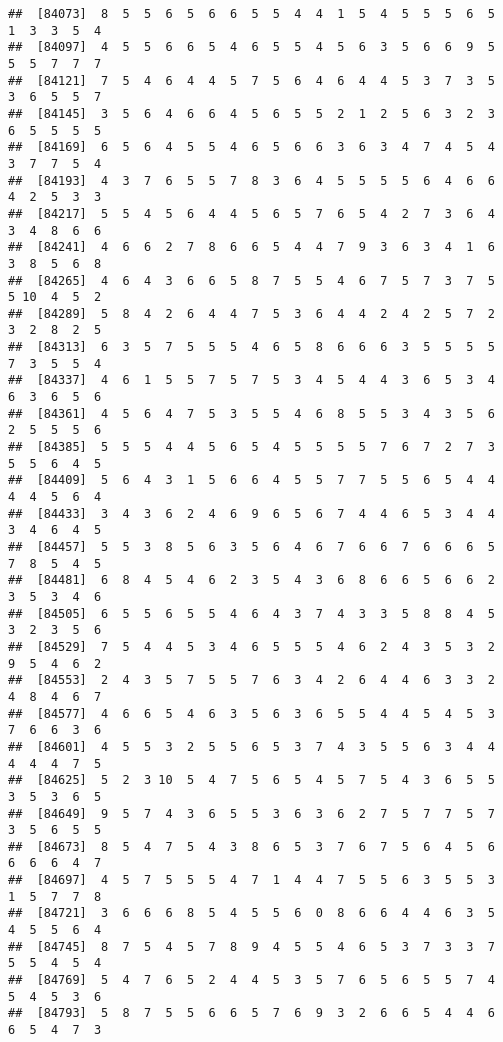 \documentclass[
]{book}
\begin{document}
\begin{verbatim}
##  [84073]  8  5  5  6  5  6  6  5  5  4  4  1  5  4  5  5  5  6  5  1  3  3  5  4
##  [84097]  4  5  5  6  6  5  4  6  5  5  4  5  6  3  5  6  6  9  5  5  5  7  7  7
##  [84121]  7  5  4  6  4  4  5  7  5  6  4  6  4  4  5  3  7  3  5  3  6  5  5  7
##  [84145]  3  5  6  4  6  6  4  5  6  5  5  2  1  2  5  6  3  2  3  6  5  5  5  5
##  [84169]  6  5  6  4  5  5  4  6  5  6  6  3  6  3  4  7  4  5  4  3  7  7  5  4
##  [84193]  4  3  7  6  5  5  7  8  3  6  4  5  5  5  5  6  4  6  6  4  2  5  3  3
##  [84217]  5  5  4  5  6  4  4  5  6  5  7  6  5  4  2  7  3  6  4  3  4  8  6  6
##  [84241]  4  6  6  2  7  8  6  6  5  4  4  7  9  3  6  3  4  1  6  3  8  5  6  8
##  [84265]  4  6  4  3  6  6  5  8  7  5  5  4  6  7  5  7  3  7  5  5 10  4  5  2
##  [84289]  5  8  4  2  6  4  4  7  5  3  6  4  4  2  4  2  5  7  2  3  2  8  2  5
##  [84313]  6  3  5  7  5  5  5  4  6  5  8  6  6  6  3  5  5  5  5  7  3  5  5  4
##  [84337]  4  6  1  5  5  7  5  7  5  3  4  5  4  4  3  6  5  3  4  6  3  6  5  6
##  [84361]  4  5  6  4  7  5  3  5  5  4  6  8  5  5  3  4  3  5  6  2  5  5  5  6
##  [84385]  5  5  5  4  4  5  6  5  4  5  5  5  5  7  6  7  2  7  3  5  5  6  4  5
##  [84409]  5  6  4  3  1  5  6  6  4  5  5  7  7  5  5  6  5  4  4  4  4  5  6  4
##  [84433]  3  4  3  6  2  4  6  9  6  5  6  7  4  4  6  5  3  4  4  3  4  6  4  5
##  [84457]  5  5  3  8  5  6  3  5  6  4  6  7  6  6  7  6  6  6  5  7  8  5  4  5
##  [84481]  6  8  4  5  4  6  2  3  5  4  3  6  8  6  6  5  6  6  2  3  5  3  4  6
##  [84505]  6  5  5  6  5  5  4  6  4  3  7  4  3  3  5  8  8  4  5  3  2  3  5  6
##  [84529]  7  5  4  4  5  3  4  6  5  5  5  4  6  2  4  3  5  3  2  9  5  4  6  2
##  [84553]  2  4  3  5  7  5  5  7  6  3  4  2  6  4  4  6  3  3  2  4  8  4  6  7
##  [84577]  4  6  6  5  4  6  3  5  6  3  6  5  5  4  4  5  4  5  3  7  6  6  3  6
##  [84601]  4  5  5  3  2  5  5  6  5  3  7  4  3  5  5  6  3  4  4  4  4  4  7  5
##  [84625]  5  2  3 10  5  4  7  5  6  5  4  5  7  5  4  3  6  5  5  3  5  3  6  5
##  [84649]  9  5  7  4  3  6  5  5  3  6  3  6  2  7  5  7  7  5  7  3  5  6  5  5
##  [84673]  8  5  4  7  5  4  3  8  6  5  3  7  6  7  5  6  4  5  6  6  6  6  4  7
##  [84697]  4  5  7  5  5  5  4  7  1  4  4  7  5  5  6  3  5  5  3  1  5  7  7  8
##  [84721]  3  6  6  6  8  5  4  5  5  6  0  8  6  6  4  4  6  3  5  4  5  5  6  4
##  [84745]  8  7  5  4  5  7  8  9  4  5  5  4  6  5  3  7  3  3  7  5  5  4  5  4
##  [84769]  5  4  7  6  5  2  4  4  5  3  5  7  6  5  6  5  5  7  4  5  4  5  3  6
##  [84793]  5  8  7  5  5  6  6  5  7  6  9  3  2  6  6  5  4  4  6  6  5  4  7  3

\end{verbatim}
\end{document}
